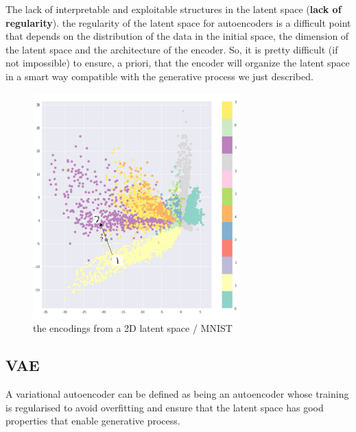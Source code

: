 The lack of interpretable and exploitable structures in the latent space (\textbf{lack of regularity}).
the regularity of the latent space for autoencoders is a difficult point that depends on the distribution of the data in the initial space, the dimension of the latent space and the architecture of the encoder. So, it is pretty difficult (if not impossible) to ensure, a priori, that the encoder will organize the latent space in a smart way compatible with the generative process we just described.

\begin{figure}[H]
    \centering
    \includegraphics[width=8cm]{images/mnist_ae_latent_space.png}
    \caption{the encodings from a 2D latent space / MNIST}
    \label{fig:mnist_ae_latent_space}
\end{figure}

\subsection{VAE}

A variational autoencoder can be defined as being an autoencoder whose training is
regularised to avoid overfitting and ensure that the latent space has good properties
that enable generative process.

